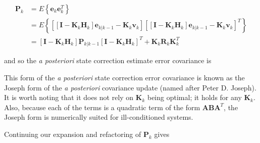 \documentclass[12pt]{article}
\begin{document}
\begin{equation*}
    \begin{aligned}
        \mathbf{P}_{k} &= E \left\{ \mathbf{e}_{k} \mathbf{e}_{k}^T \right\} \\
        &= E \left\{ \left[ \left[ \mathbf{I} - \mathbf{K}_k \mathbf{H}_k \right] \mathbf{e}_{k|k-1} - \mathbf{K}_k \mathbf{v}_k \right]
                \left[ \left[ \mathbf{I} - \mathbf{K}_k \mathbf{H}_k \right] \mathbf{e}_{k|k-1} - \mathbf{K}_k \mathbf{v}_k \right]^T \right\} \\
        &= \left[ \mathbf{I} - \mathbf{K}_k \mathbf{H}_k \right] \mathbf{P}_{k|k-1} \left[ \mathbf{I} - \mathbf{K}_k \mathbf{H}_k \right]^T
                 + \mathbf{K}_k \mathbf{R}_k \mathbf{K}_k^T
    \end{aligned}
\end{equation*}

and so the \textit{a posteriori} state correction estimate error covariance is


This form of the \textit{a posteriori} state correction error covariance is known as the
Joseph form of the \textit{a posteriori} covariance update (named after Peter D. Joseph).
It is worth noting that it does not rely on $\mathbf{K}_{k}$ being optimal; it holds for
any $\mathbf{K}_{k}$. Also, because each of the terms is a quadratic term of the form 
$\mathbf{A} \mathbf{B} \mathbf{A}^T$, the Joseph form is numerically suited for
ill-conditioned systems.

Continuing our expansion and refactoring of $\mathbf{P}_{k}$ gives
\end{document}
